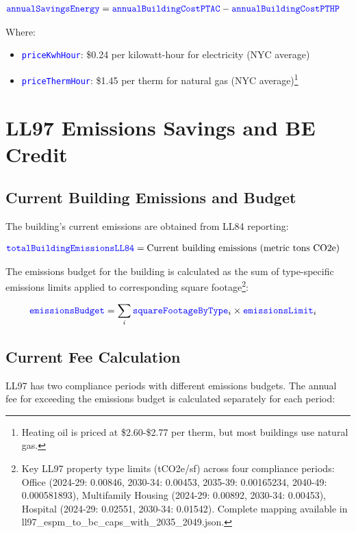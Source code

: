 \documentclass{article}
\newcommand{\code}[1]{\textcolor{blue}{\texttt{#1}}}
\begin{document}
\begin{align}
\code{annualSavingsEnergy} &= \code{annualBuildingCostPTAC} - \code{annualBuildingCostPTHP}
\end{align}

Where:
\begin{itemize}
    \item \code{priceKwhHour}: \$0.24 per kilowatt-hour for electricity (NYC average)
    \item \code{priceThermHour}: \$1.45 per therm for natural gas (NYC average)\footnote{Heating oil is priced at \$2.60-\$2.77 per therm, but most buildings use natural gas.}
\end{itemize}

\section{LL97 Emissions Savings and BE Credit}

\subsection{Current Building Emissions and Budget}

The building's current emissions are obtained from LL84 reporting:

\begin{align}
\code{totalBuildingEmissionsLL84} &= \text{Current building emissions (metric tons CO2e)}
\end{align}

The emissions budget for the building is calculated as the sum of type-specific emissions limits applied to corresponding square footage\footnote{Key LL97 property type limits (tCO2e/sf) across four compliance periods: Office (2024-29: 0.00846, 2030-34: 0.00453, 2035-39: 0.00165234, 2040-49: 0.000581893), Multifamily Housing (2024-29: 0.00892, 2030-34: 0.00453), Hospital (2024-29: 0.02551, 2030-34: 0.01542). Complete mapping available in ll97\_espm\_to\_bc\_caps\_with\_2035\_2049.json.}:

\begin{align}
\code{emissionsBudget} &= \sum_{i} \code{squareFootageByType}_i \times \code{emissionsLimit}_i
\end{align}

\subsection{Current Fee Calculation}

LL97 has two compliance periods with different emissions budgets. The annual fee for exceeding the emissions budget is calculated separately for each period:
\end{document}
